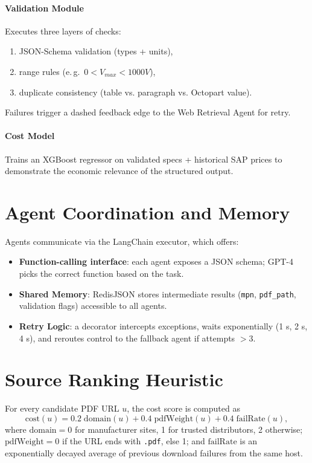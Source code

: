 \paragraph{Validation Module}  
Executes three layers of checks:
\begin{enumerate}
  \item JSON-Schema validation (types + units),
  \item range rules (e.\,g.\ $0 < V_{max} < 1000V$),
  \item duplicate consistency (table vs. paragraph vs. Octopart value).
\end{enumerate}  
Failures trigger a dashed feedback edge to the Web Retrieval Agent for retry.

\paragraph{Cost Model}  
Trains an XGBoost regressor on validated specs + historical SAP prices to demonstrate the economic relevance of the structured output.

\section{Agent Coordination and Memory}
Agents communicate via the LangChain executor, which offers:  
\begin{itemize}
  \item \textbf{Function-calling interface}: each agent exposes a JSON schema; GPT-4 picks the correct function based on the task.  
  \item \textbf{Shared Memory}: RedisJSON stores intermediate results (\verb|mpn|, \verb|pdf_path|, validation flags) accessible to all agents.  
  \item \textbf{Retry Logic}: a decorator intercepts exceptions, waits exponentially (1 s, 2 s, 4 s), and reroutes control to the fallback agent if attempts $>3$.
\end{itemize}

\section{Source Ranking Heuristic}
For every candidate PDF URL $u$, the cost score is computed as
\begin{equation}
\label{eq:heuristic}
\mathrm{cost}(u)=0.2\;\mathrm{domain}(u)+0.4\;\mathrm{pdfWeight}(u)+0.4\;\mathrm{failRate}(u),
\end{equation}
where \(\mathrm{domain}=0\) for manufacturer sites, 1 for trusted distributors, 2 otherwise;  
\(\mathrm{pdfWeight}=0\) if the URL ends with \texttt{.pdf}, else 1;  
and \(\mathrm{failRate}\) is an exponentially decayed average of previous download failures from the same host.

